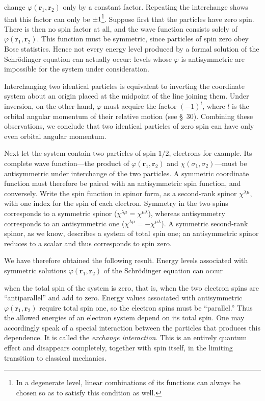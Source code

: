 change $\varphi(\mathbf r_1,\mathbf r_2)$ only by a constant factor. Repeating the interchange shows that this factor can only be $\pm1$\footnote{In a degenerate level, linear combinations of its functions can always be chosen so as to satisfy this condition as well.}.
Suppose first that the particles have zero spin. There is then no spin factor at all, and the wave function consists solely of $\varphi(\mathbf r_1,\mathbf r_2)$. This function must be symmetric, since particles of spin zero obey Bose statistics. Hence not every energy level produced by a formal solution of the Schrödinger equation can actually occur: levels whose $\varphi$ is antisymmetric are impossible for the system under consideration.

Interchanging two identical particles is equivalent to inverting the coordinate system about an origin placed at the midpoint of the line joining them. Under inversion, on the other hand, $\varphi$ must acquire the factor $(-1)^l$, where $l$ is the orbital angular momentum of their relative motion (see §~30). Combining these observations, we conclude that two identical particles of zero spin can have only even orbital angular momentum.

Next let the system contain two particles of spin $1/2$, electrons for example. Its complete wave function---the product of $\varphi(\mathbf r_1,\mathbf r_2)$ and $\chi(\sigma_1,\sigma_2)$---must be antisymmetric under interchange of the two particles. A symmetric coordinate function must therefore be paired with an antisymmetric spin function, and conversely. Write the spin function in spinor form, as a second-rank spinor $\chi^{\lambda\mu}$, with one index for the spin of each electron. Symmetry in the two spins corresponds to a symmetric spinor ($\chi^{\lambda\mu}=\chi^{\mu\lambda}$), whereas antisymmetry corresponds to an antisymmetric one ($\chi^{\lambda\mu}=-\chi^{\mu\lambda}$). A symmetric second-rank spinor, as we know, describes a system of total spin one; an antisymmetric spinor reduces to a scalar and thus corresponds to spin zero.

We have therefore obtained the following result. Energy levels associated with symmetric solutions $\varphi(\mathbf r_1,\mathbf r_2)$ of the Schrödinger equation can occur

when the total spin of the system is zero, that is, when the two electron spins are ``antiparallel'' and add to zero. Energy values associated with antisymmetric $\varphi(\mathbf r_1,\mathbf r_2)$ require total spin one, so the electron spins must be ``parallel.''
Thus the allowed energies of an electron system depend on its total spin. One may accordingly speak of a special interaction between the particles that produces this dependence. It is called the \emph{exchange interaction}. This is an entirely quantum effect and disappears completely, together with spin itself, in the limiting transition to classical mechanics.

